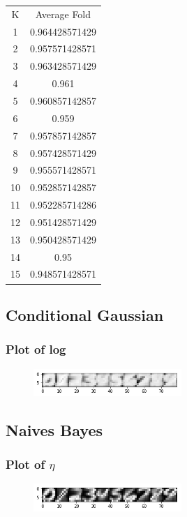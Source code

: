 \documentclass[letterpaper, 12]{article}
\begin{document}
\begin{center}
\begin{tabular}{ |c|c| } 
 \hline
K & Average Fold \\ 
1  &  0.964428571429\\
2  &  0.957571428571\\
3  &  0.963428571429\\
4  &  0.961\\
5  &  0.960857142857\\
6  &  0.959\\
7  &  0.957857142857\\
8  &  0.957428571429\\
9  &  0.955571428571\\
10  &  0.952857142857\\
11  &  0.952285714286\\
12  &  0.951428571429\\
13  &  0.950428571429\\
14  &  0.95\\
15  &  0.948571428571\\
 \hline
\end{tabular}
\end{center}


\subsection{Conditional Gaussian}
\subsubsection{Plot of log}
\begin{figure}[H]
\centering
\includegraphics[width=0.5\textwidth]{log_sigma_k.png}
\caption{\label{}}
\end{figure}



\subsection{Naives Bayes}
\subsubsection{Plot of $\eta$}
\begin{figure}[H]
\centering
\includegraphics[width=0.5\textwidth]{q3_eta.png}
\caption{\label{}}
\end{figure}
\end{document}
